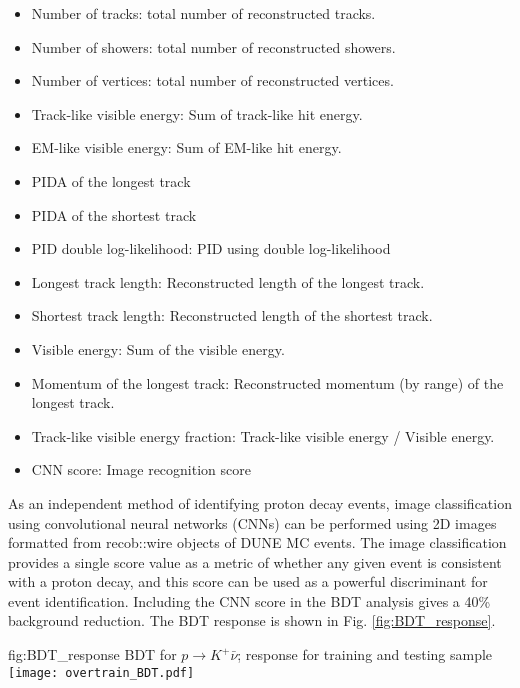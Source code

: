   \begin{itemize}
  \item Number of tracks: total number of reconstructed tracks. 
  \item Number of showers: total number of reconstructed showers.
  \item Number of vertices: total number of reconstructed vertices.
  \item Track-like visible energy: Sum of track-like hit energy.
  \item EM-like visible energy: Sum of EM-like hit energy.
  \item PIDA of the longest track
  \item PIDA of the shortest track
  \item PID double log-likelihood: PID using double log-likelihood 
  \item Longest track length: Reconstructed length of the longest track.
  \item Shortest track length: Reconstructed length of the shortest track.
  \item Visible energy: Sum of the visible energy.
  \item Momentum of the longest track: Reconstructed momentum (by range) of the longest track.
  \item Track-like visible energy fraction: Track-like visible energy / Visible energy.
  \item CNN score: Image recognition score
  \end{itemize} 
As an independent method of identifying proton decay events, image classification using convolutional neural networks (CNNs) can be performed using 2D images formatted from recob::wire objects of DUNE MC events. The image classification provides a single score value as a metric of whether any given event is consistent with a proton decay, and this score can be used as a powerful discriminant for event identification.  Including the CNN score in the BDT analysis gives a 40\% background reduction.
The BDT response is shown in Fig. \ref{fig:BDT_response}. 

\begin{dunefigure}
{fig:BDT_response}
{BDT for $p\rightarrow K^{+} \bar{\nu}$; response for training and testing sample}
\texttt{[image: overtrain\_BDT.pdf]}
\end{dunefigure} 

